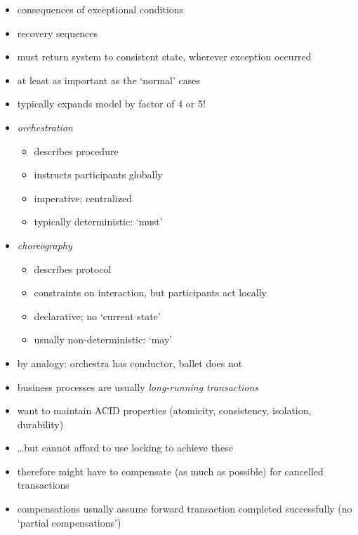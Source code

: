 \documentclass{sepslide-soa-faked} %
\begin{document}
\begin{slide}
\begin{itemize}
\item consequences of exceptional conditions
\item recovery sequences
\item must return system to consistent state, wherever exception occurred
\item at least as important as the `normal' cases
\item typically expands model by factor of 4 or 5!
\end{itemize}
\end{slide}

\begin{slide}
\begin{itemize}
\item \emph{orchestration} 
\begin{itemize}
\item describes procedure
\item instructs participants globally
\item imperative; centralized
\item typically deterministic: `must'
\end{itemize}
\item \emph{choreography} 
\begin{itemize}
\item describes protocol
\item constraints on interaction, but participants act locally
\item declarative; no `current state'
\item usually non-deterministic: `may'
\end{itemize}
\item by analogy: orchestra has conductor, ballet does not
\end{itemize}
\end{slide}

\begin{slide}
\begin{itemize}
\item business processes are usually \emph{long-running transactions}
\item want to maintain ACID properties (atomicity, consistency, isolation,
durability) 
\item \ldots but cannot afford to use locking to achieve these
\item therefore might have to compensate (as much as possible) for
cancelled transactions 
\item compensations usually assume forward transaction completed successfully
  (no `partial compensations')
\end{itemize}
\end{slide}
\end{document}
